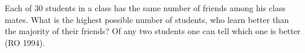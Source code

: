 Each of $30$ students in a class has the same number of friends among his class mates. What is the highest possible number of students, who learn better than the majority of their friends? Of any two students one can tell which one is better (RO 1994).
